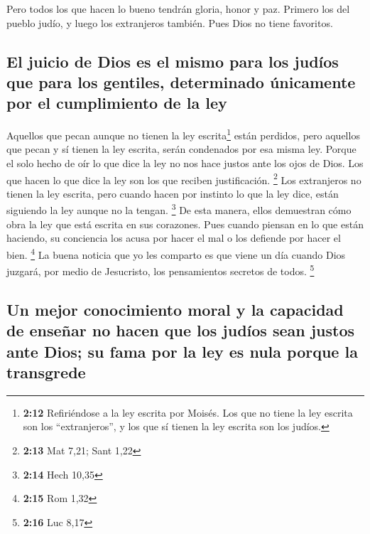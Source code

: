  Pero todos los que hacen lo bueno tendrán gloria, honor
y paz. Primero los del pueblo judío, y luego los extranjeros también.
 Pues Dios no tiene favoritos.

\hypertarget{el-juicio-de-dios-es-el-mismo-para-los-juduxedos-que-para-los-gentiles-determinado-uxfanicamente-por-el-cumplimiento-de-la-ley}{%
\subsection{El juicio de Dios es el mismo para los judíos que para los
gentiles, determinado únicamente por el cumplimiento de la
ley}\label{el-juicio-de-dios-es-el-mismo-para-los-juduxedos-que-para-los-gentiles-determinado-uxfanicamente-por-el-cumplimiento-de-la-ley}}

 Aquellos que pecan aunque no tienen la ley
escrita\footnote{\textbf{2:12} Refiriéndose a la ley escrita por Moisés.
  Los que no tiene la ley escrita son los ``extranjeros'', y los que sí
  tienen la ley escrita son los judíos.} están perdidos, pero aquellos
que pecan y sí tienen la ley escrita, serán condenados por esa misma
ley.  Porque el solo hecho de oír lo que dice la ley no
nos hace justos ante los ojos de Dios. Los que hacen lo que dice la ley
son los que reciben justificación. \footnote{\textbf{2:13} Mat 7,21;
  Sant 1,22}  Los extranjeros no tienen la ley escrita,
pero cuando hacen por instinto lo que la ley dice, están siguiendo la
ley aunque no la tengan. \footnote{\textbf{2:14} Hech 10,35}
 De esta manera, ellos demuestran cómo obra la ley que
está escrita en sus corazones. Pues cuando piensan en lo que están
haciendo, su conciencia los acusa por hacer el mal o los defiende por
hacer el bien. \footnote{\textbf{2:15} Rom 1,32}  La
buena noticia que yo les comparto es que viene un día cuando Dios
juzgará, por medio de Jesucristo, los pensamientos secretos de todos.
\footnote{\textbf{2:16} Luc 8,17}

\hypertarget{un-mejor-conocimiento-moral-y-la-capacidad-de-enseuxf1ar-no-hacen-que-los-juduxedos-sean-justos-ante-dios-su-fama-por-la-ley-es-nula-porque-la-transgrede}{%
\subsection{Un mejor conocimiento moral y la capacidad de enseñar no
hacen que los judíos sean justos ante Dios; su fama por la ley es nula
porque la
transgrede}\label{un-mejor-conocimiento-moral-y-la-capacidad-de-enseuxf1ar-no-hacen-que-los-juduxedos-sean-justos-ante-dios-su-fama-por-la-ley-es-nula-porque-la-transgrede}}

